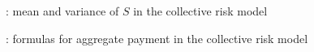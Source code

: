 \subsection*{}
\item {}: mean and variance of \(S\) in the collective risk model
\item {}: formulas for aggregate payment in the collective risk model
